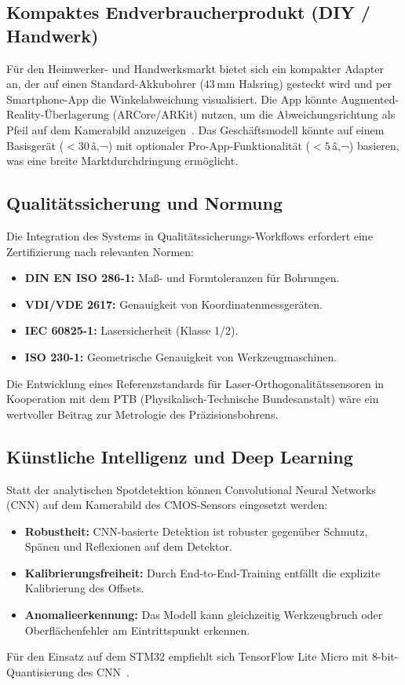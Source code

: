 ﻿\documentclass[a4paper,12pt]{article}
\theoremstyle{definition}
\begin{document}
\subsection{Kompaktes Endverbraucherprodukt (DIY / Handwerk)}

Für den Heimwerker- und Handwerksmarkt bietet sich ein kompakter Adapter an,
der auf einen Standard-Akkubohrer ($43\,\mathrm{mm}$ Halsring) gesteckt wird
und per Smartphone-App die Winkelabweichung visualisiert.
Die App könnte Augmented-Reality-Überlagerung (ARCore/ARKit) nutzen, um
die Abweichungsrichtung als Pfeil auf dem Kamerabild anzuzeigen~\cite{azuma1997survey}.
Das Geschäftsmodell könnte auf einem Basisgerät ($< 30\,$â‚¬) mit optionaler
Pro-App-Funktionalität ($< 5\,$â‚¬) basieren, was eine breite Marktdurchdringung
ermöglicht.

\subsection{Qualitätssicherung und Normung}

Die Integration des Systems in Qualitätssicherungs-Workflows erfordert eine
Zertifizierung nach relevanten Normen:
\begin{itemize}
  \item \textbf{DIN EN ISO 286-1:} Maß- und Formtoleranzen für Bohrungen.
  \item \textbf{VDI/VDE 2617:} Genauigkeit von Koordinatenmessgeräten.
  \item \textbf{IEC 60825-1:} Lasersicherheit (Klasse 1/2).
  \item \textbf{ISO 230-1:} Geometrische Genauigkeit von Werkzeugmaschinen.
\end{itemize}
Die Entwicklung eines Referenzstandards für Laser-Orthogonalitätssensoren
in Kooperation mit dem PTB (Physikalisch-Technische Bundesanstalt) wäre
ein wertvoller Beitrag zur Metrologie des Präzisionsbohrens.

\subsection{Künstliche Intelligenz und Deep Learning}

Statt der analytischen Spotdetektion können Convolutional Neural Networks (CNN)
auf dem Kamerabild des CMOS-Sensors eingesetzt werden:
\begin{itemize}
  \item \textbf{Robustheit:} CNN-basierte Detektion ist robuster gegenüber
    Schmutz, Spänen und Reflexionen auf dem Detektor.
  \item \textbf{Kalibrierungsfreiheit:} Durch End-to-End-Training entfällt
    die explizite Kalibrierung des Offsets.
  \item \textbf{Anomalieerkennung:} Das Modell kann gleichzeitig
    Werkzeugbruch oder Oberflächenfehler am Eintrittspunkt erkennen.
\end{itemize}
Für den Einsatz auf dem STM32 empfiehlt sich TensorFlow Lite Micro mit
8-bit-Quantisierung des CNN~\cite{warden2019tinyml}.
\end{document}
